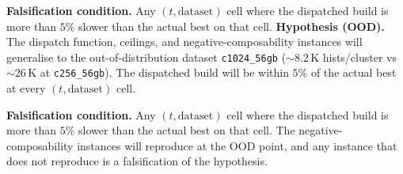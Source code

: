 \textbf{Falsification condition.} Any $(t, \text{dataset})$ cell where the dispatched build is more than $5\%$ slower than the actual best on that cell.
\textbf{Hypothesis (OOD).} The dispatch function, ceilings, and negative-composability instances will generalise to the out-of-distribution dataset \texttt{c1024\_56gb} ($\sim\!8.2$\,K hists/cluster vs $\sim\!26$\,K at \texttt{c256\_56gb}). The dispatched build will be within $5\%$ of the actual best at every $(t, \text{dataset})$ cell.

\textbf{Falsification condition.} Any $(t, \text{dataset})$ cell where the dispatched build is more than $5\%$ slower than the actual best on that cell. The negative-composability instances will reproduce at the OOD point, and any instance that does not reproduce is a falsification of the hypothesis.